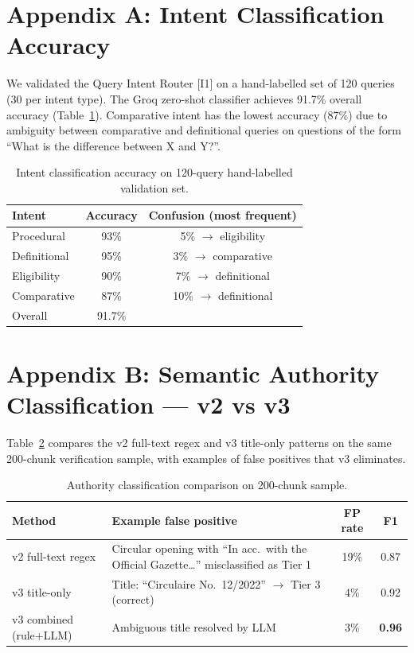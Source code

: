 \documentclass[12pt,a4paper]{article}
\begin{document}
\appendix

\section{Appendix A: Intent Classification Accuracy}

We validated the Query Intent Router [I1] on a hand-labelled set of 120 queries
(30 per intent type). The Groq zero-shot classifier achieves 91.7\% overall
accuracy (Table~\ref{tab:intent_cls_acc}). Comparative intent has the lowest
accuracy (87\%) due to ambiguity between comparative and definitional queries
on questions of the form ``What is the difference between X and Y?''.

\begin{table}[H]
\centering
\caption{Intent classification accuracy on 120-query hand-labelled validation set.}
\label{tab:intent_cls_acc}
\begin{tabular}{lcc}
\toprule
\textbf{Intent} & \textbf{Accuracy} & \textbf{Confusion (most frequent)} \\
\midrule
Procedural   & 93\% & 5\% $\to$ eligibility \\
Definitional & 95\% & 3\% $\to$ comparative \\
Eligibility  & 90\% & 7\% $\to$ definitional \\
Comparative  & 87\% & 10\% $\to$ definitional \\
\midrule
Overall      & 91.7\% & \\
\bottomrule
\end{tabular}
\end{table}

\section{Appendix B: Semantic Authority Classification — v2 vs v3}

Table~\ref{tab:appendix_authority} compares the v2 full-text regex and v3
title-only patterns on the same 200-chunk verification sample, with examples of
false positives that v3 eliminates.

\begin{table}[H]
\centering
\caption{Authority classification comparison on 200-chunk sample.}
\label{tab:appendix_authority}
\begin{tabular}{lp{5cm}cc}
\toprule
\textbf{Method} & \textbf{Example false positive} & \textbf{FP rate} & \textbf{F1} \\
\midrule
v2 full-text regex & Circular opening with ``In acc.\ with the Official Gazette\ldots'' misclassified as Tier 1 & 19\% & 0.87 \\
v3 title-only      & Title: ``Circulaire No.\ 12/2022'' $\to$ Tier 3 (correct) & 4\% & 0.92 \\
v3 combined (rule+LLM) & Ambiguous title resolved by LLM & 3\% & \textbf{0.96} \\
\bottomrule
\end{tabular}
\end{table}
\end{document}
